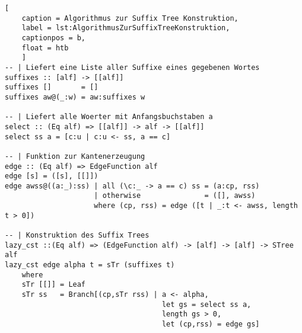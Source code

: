 \documentclass[12pt]{report}
\begin{document}
\begin{lstlisting}[
    caption = Algorithmus zur Suffix Tree Konstruktion,
    label = lst:AlgorithmusZurSuffixTreeKonstruktion,
    captionpos = b,
    float = htb
    ]
-- | Liefert eine Liste aller Suffixe eines gegebenen Wortes
suffixes :: [alf] -> [[alf]]
suffixes []       = []
suffixes aw@(_:w) = aw:suffixes w

-- | Liefert alle Woerter mit Anfangsbuchstaben a
select :: (Eq alf) => [[alf]] -> alf -> [[alf]]
select ss a = [c:u | c:u <- ss, a == c]

-- | Funktion zur Kantenerzeugung
edge :: (Eq alf) => EdgeFunction alf
edge [s] = ([s], [[]])
edge awss@((a:_):ss) | all (\c:_ -> a == c) ss = (a:cp, rss)
                     | otherwise               = ([], awss)
                     where (cp, rss) = edge ([t | _:t <- awss, length t > 0])

-- | Konstruktion des Suffix Trees
lazy_cst ::(Eq alf) => (EdgeFunction alf) -> [alf] -> [alf] -> STree alf
lazy_cst edge alpha t = sTr (suffixes t)
    where
    sTr [[]] = Leaf
    sTr ss   = Branch[(cp,sTr rss) | a <- alpha,
                                     let gs = select ss a,
                                     length gs > 0,
                                     let (cp,rss) = edge gs]
\end{lstlisting}




\end{document}
